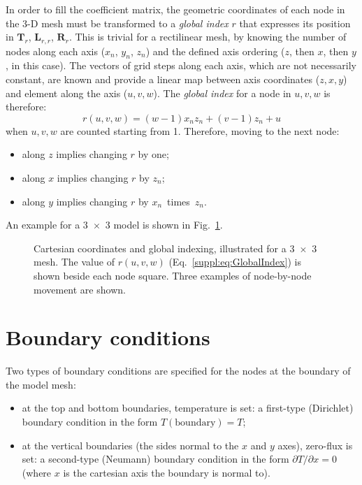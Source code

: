In order to fill the coefficient matrix, the geometric coordinates of each node in the 3-D mesh must be transformed to a \textit{global index} $r$ that expresses its position in $\bm{T}_r$, $\bm{L}_{r,r}$, $\bm{R}_r$.
This is trivial for a rectilinear mesh, by knowing the number of nodes along each axis ($x_n$, $y_n$, $z_n$) and the defined axis ordering ($z$, then $x$, then $y$, in this case).
The vectors of grid steps along each axis, which are not necessarily constant, are known and provide a linear map between axis coordinates ($z,x,y$) and element along the axis ($u,v,w$).
The \textit{global index} for a node in $u,v,w$ is therefore:
\begin{equation}
    \label{suppl:eq:GlobalIndex}
    r(u,v,w) = (w-1) x_n z_n + (v-1) z_n + u
\end{equation}
when $u,v,w$ are counted starting from \num{1}.
Therefore, moving to the next node:
\begin{itemize}
    \item along $z$ implies changing $r$ by one;
    \item along $x$ implies changing $r$ by $z_n$;
    \item along $y$ implies changing $r$ by $x_n$~times~$z_n$.
\end{itemize}
An example for a 3~$\times$~3 model is shown in Fig.~\ref{suppl:fig:GridIndexing}.

\begin{figure}[h]
    \begin{adjustbox}{center}
    \end{adjustbox}
    \caption[Cartesian coordinates and global indexing on a 3~$\times$~3 mesh.]{Cartesian coordinates and global indexing, illustrated for a 3~$\times$~3 mesh. The value of $r(u,v,w)$ (Eq.~\ref{suppl:eq:GlobalIndex}) is shown beside each node square. Three examples of node-by-node movement are shown.}
    \label{suppl:fig:GridIndexing}
\end{figure}

\FloatBarrier

\section{Boundary conditions}
\label{s:ThermModel:FD_BoundaryConditions}
Two types of boundary conditions are specified for the nodes at the boundary of the model mesh:
\begin{itemize}
    \item at the top and bottom boundaries, temperature is set: a first-type (Dirichlet) boundary condition in the form $T(\mathrm{boundary}) = T$;
    \item at the vertical boundaries (the sides normal to the $x$ and $y$ axes), zero-flux is set: a second-type (Neumann) boundary condition in the form $\partial T / \partial x = 0$ (where $x$ is the cartesian axis the boundary is normal to).
\end{itemize}

